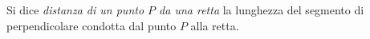 % 

\begin{definizione}
Si dice \emph{distanza di un punto \(P\) da una retta} la lunghezza del 
segmento di perpendicolare condotta dal punto \(P\) alla retta.
\end{definizione}

